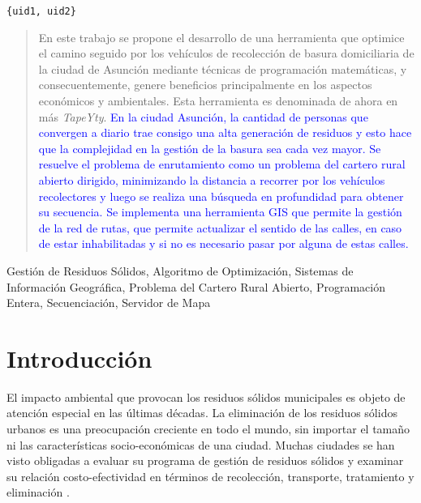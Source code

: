 \documentclass[spanish, conference]{IEEEtran}
\begin{document}
{\tt \{uid1, uid2\}

\maketitle

\begin{abstract}
En este trabajo se propone el desarrollo de una herramienta que optimice el camino seguido por los vehículos de recolección de basura domiciliaria de la ciudad de Asunción mediante técnicas de programación matemáticas, y consecuentemente, genere beneficios principalmente en los aspectos económicos y ambientales. Esta herramienta es denominada de ahora en más \textit{TapeYty}. \textcolor{blue}{En la ciudad Asunción, la cantidad de personas que convergen a diario trae consigo una alta generación de residuos y esto hace que la complejidad en la gestión de la basura sea cada vez mayor. Se resuelve el problema de enrutamiento como un problema del cartero rural abierto dirigido, minimizando la distancia a recorrer por los vehículos recolectores y luego se realiza una búsqueda en profundidad para obtener su secuencia. Se implementa una herramienta GIS que permite la gestión de la red de rutas, que permite actualizar el sentido de las calles, en caso de estar inhabilitadas y si no es necesario pasar por alguna de estas calles.}
\end{abstract}

\begin{IEEEkeywords}
Gestión de Residuos Sólidos, Algoritmo de Optimización, Sistemas de Información Geográfica, Problema del Cartero Rural Abierto, Programación Entera, Secuenciación, Servidor de Mapa
\end{IEEEkeywords}

\section{Introducción}
El impacto ambiental que provocan los residuos sólidos municipales es objeto de atención especial en las últimas décadas. La eliminación de los residuos sólidos urbanos es una preocupación creciente en todo el mundo, sin importar el tamaño ni las características socio-económicas de una ciudad. Muchas ciudades se han visto obligadas a evaluar su programa de gestión de residuos sólidos y examinar su relación costo-efectividad en términos de recolección, transporte, tratamiento y eliminación \cite{Karadimas2007OptimalAlgorithm}.

}
\end{document}
